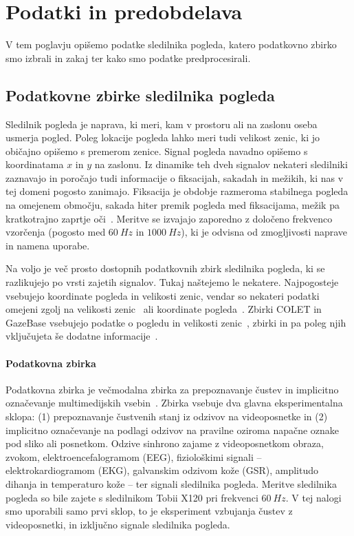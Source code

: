 \chapter{Podatki in predobdelava}
\label{sec:podatki}

V tem poglavju opišemo podatke sledilnika pogleda, katero podatkovno zbirko smo izbrali in zakaj ter kako smo podatke predprocesirali.

\section{Podatkovne zbirke sledilnika pogleda}
\label{sec:podatkovne-zbirke}

Sledilnik pogleda je naprava, ki meri, kam v prostoru ali na zaslonu oseba usmerja pogled.
Poleg lokacije pogleda lahko meri tudi velikost zenic, ki jo običajno opišemo s premerom zenice.
Signal pogleda navadno opišemo s koordinatama $x$ in $y$ na zaslonu.
Iz dinamike teh dveh signalov nekateri sledilniki zaznavajo in poročajo tudi informacije o fiksacijah, sakadah in mežikih, ki nas v tej domeni pogosto zanimajo.
Fiksacija je obdobje razmeroma stabilnega pogleda na omejenem območju, sakada hiter premik pogleda med fiksacijama, mežik pa kratkotrajno zaprtje oči~\cite{lim2020emotion}.
Meritve se izvajajo zaporedno z določeno frekvenco vzorčenja (pogosto med $60~Hz$ in $1000~Hz$), ki je odvisna od zmogljivosti naprave in namena uporabe.

Na voljo je več prosto dostopnih podatkovnih zbirk sledilnika pogleda, ki se razlikujejo po vrsti zajetih signalov. 
Tukaj naštejemo le nekatere.
Najpogosteje vsebujejo koordinate pogleda in velikosti zenic, vendar so nekateri podatki omejeni zgolj na velikosti zenic~\cite{pedrotti2014stress} ali koordinate pogleda~\cite{bellet2019saccade}.
Zbirki COLET in GazeBase vsebujejo podatke o pogledu in velikosti zenic~\cite{ktistakis2022colet,griffith2021gazebase}, zbirki \MAHNOB{} in \ESEED{} pa poleg njih vključujeta še dodatne informacije~\cite{soleymani2012mahnob,skaramagkas2023eseed}.

\subsubsection*{Podatkovna zbirka \MAHNOB{}}

Podatkovna zbirka \MAHNOB{} je večmodalna zbirka za prepoznavanje čustev in implicitno označevanje multimedijskih vsebin~\cite{soleymani2012mahnob}.
Zbirka vsebuje dva glavna eksperimentalna sklopa: (1) prepoznavanje čustvenih stanj iz odzivov na videoposnetke in (2) implicitno označevanje na podlagi odzivov na pravilne oziroma napačne oznake pod sliko ali posnetkom.
Odzive sinhrono zajame z videoposnetkom obraza, zvokom, elektroencefalogramom (EEG), fiziološkimi signali -- elektrokardiogramom (EKG), galvanskim odzivom kože (GSR), amplitudo dihanja in temperaturo kože -- ter signali sledilnika pogleda.
Meritve sledilnika pogleda so bile zajete s sledilnikom Tobii X120 pri frekvenci $60~Hz$.
V tej nalogi smo uporabili samo prvi sklop, to je eksperiment vzbujanja čustev z videoposnetki, in izključno signale sledilnika pogleda.

